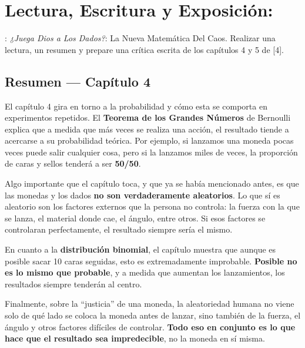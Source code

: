 
\section{Lectura, Escritura y Exposición:}


: \textit{¿Juega Dios a Los Dados?}: La Nueva
Matemática Del Caos. Realizar una lectura, un resumen y prepare una crítica escrita de
los capítulos 4 y 5 de [4].

\subsection{Resumen — Capítulo 4}

\begin{respuesta}[title=Resumen Capítulo 4]

El capítulo 4 gira en torno a la probabilidad y cómo esta se comporta en experimentos
repetidos. El \textbf{Teorema de los Grandes Números} de Bernoulli explica que a medida
que más veces se realiza una acción, el resultado tiende a acercarse a su probabilidad
teórica. Por ejemplo, si lanzamos una moneda pocas veces puede salir cualquier cosa,
pero si la lanzamos miles de veces, la proporción de caras y sellos tenderá a ser
\textbf{50/50}.

\medskip

Algo importante que el capítulo toca, y que ya se había mencionado antes, es que las
monedas y los dados \textbf{no son verdaderamente aleatorios}. Lo que sí es aleatorio
son los factores externos que la persona no controla: la fuerza con la que se lanza,
el material donde cae, el ángulo, entre otros. Si esos factores se controlaran
perfectamente, el resultado siempre sería el mismo.

\medskip

En cuanto a la \textbf{distribución binomial}, el capítulo muestra que aunque es posible
sacar 10 caras seguidas, esto es extremadamente improbable. \textbf{Posible no es lo
mismo que probable}, y a medida que aumentan los lanzamientos, los resultados siempre
tenderán al centro.

\medskip

Finalmente, sobre la ``justicia'' de una moneda, la aleatoriedad humana no viene solo
de qué lado se coloca la moneda antes de lanzar, sino también de la fuerza, el ángulo
y otros factores difíciles de controlar. \textbf{Todo eso en conjunto es lo que hace
que el resultado sea impredecible}, no la moneda en sí misma.

\end{respuesta}

